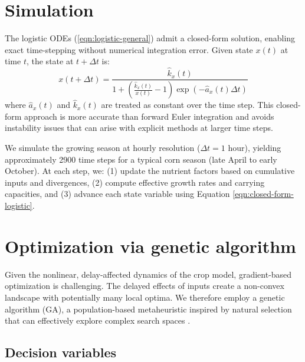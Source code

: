 \documentclass[preprint,12pt]{elsarticle}
\newcommand{\df}[2]{\displaystyle\frac{#1}{#2}}
\begin{document}
\section{Simulation}\label{sec:simulation}

The logistic ODEs (\ref{eqn:logistic-general}) admit a closed-form solution, enabling exact time-stepping without numerical integration error. Given state $x(t)$ at time $t$, the state at $t + \Delta t$ is:
\begin{equation}
x(t + \Delta t) = \df{\hat{k}_{x}(t)}{1 + \left(\df{\hat{k}_{x}(t)}{x(t)} - 1\right)\exp(-\hat{a}_{x}(t)\Delta t)}
\label{eqn:closed-form-logistic}
\end{equation}
where $\hat{a}_{x}(t)$ and $\hat{k}_{x}(t)$ are treated as constant over the time step. This closed-form approach is more accurate than forward Euler integration and avoids instability issues that can arise with explicit methods at larger time steps.

We simulate the growing season at hourly resolution ($\Delta t = 1$ hour), yielding approximately 2900 time steps for a typical corn season (late April to early October). At each step, we: (1) update the nutrient factors based on cumulative inputs and divergences, (2) compute effective growth rates and carrying capacities, and (3) advance each state variable using Equation \ref{eqn:closed-form-logistic}.

\section{Optimization via genetic algorithm}\label{sec:ga}

Given the nonlinear, delay-affected dynamics of the crop model, gradient-based optimization is challenging. The delayed effects of inputs create a non-convex landscape with potentially many local optima. We therefore employ a genetic algorithm (GA), a population-based metaheuristic inspired by natural selection that can effectively explore complex search spaces \cite{goldberg1989ga}.

\subsection{Decision variables}\label{subsec:design-vars}
\end{document}
